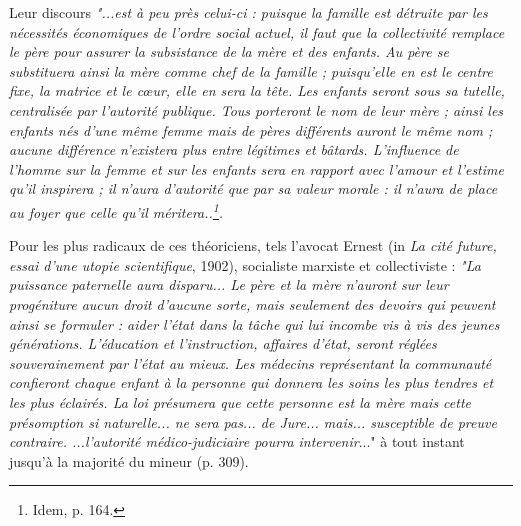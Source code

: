 Leur discours \emph{"...est à peu près celui-ci : puisque la famille est détruite par les nécessités économiques de l'ordre social actuel, il faut que la collectivité remplace le père pour assurer la subsistance de la mère et des enfants. Au père se substituera ainsi la mère comme chef de la famille ; puisqu'elle en est le centre fixe, la matrice et le cœur, elle en sera la tête. Les enfants seront sous sa tutelle, centralisée par l'autorité publique. Tous porteront le nom de leur mère ; ainsi les enfants nés d'une même femme mais de pères différents auront le même nom ; aucune différence n'existera plus entre légitimes et bâtards. L'influence de l'homme sur la femme et sur les enfants sera en rapport avec l'amour et l'estime qu'il inspirera ; il n'aura d'autorité que par sa valeur morale : il n'aura de place au foyer que celle qu'il méritera..\footnote{Idem, p. 164.}.} 

 Pour les plus radicaux de ces théoriciens, tels l'avocat Ernest  (in \emph{La cité future, essai d'une utopie scientifique}, 1902), socialiste marxiste et collectiviste : \emph{"La puissance paternelle aura disparu... Le père et la mère n'auront sur leur progéniture aucun droit d'aucune sorte, mais seulement des devoirs qui peuvent ainsi se formuler : aider l'état dans la tâche qui lui incombe vis à vis des jeunes générations. L'éducation et l'instruction, affaires d'état, seront réglées souverainement par l'état au mieux. Les médecins représentant la communauté confieront chaque enfant à la personne qui donnera les soins les plus tendres et les plus éclairés. La loi présumera que cette personne est la mère mais cette présomption si naturelle... ne sera pas... de Jure... mais... susceptible de preuve contraire.
 ...l'autorité médico-judiciaire pourra intervenir}..." à tout instant jusqu'à la majorité du mineur (p. 309). 
 
